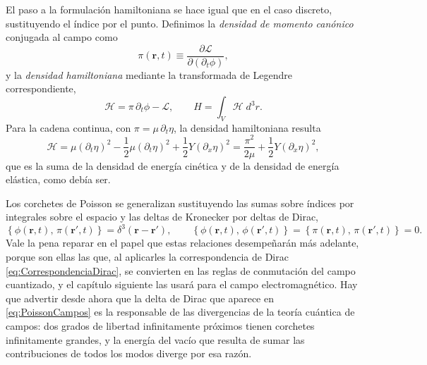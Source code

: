         El paso a la formulación hamiltoniana se hace igual que en el caso discreto, sustituyendo el índice por el punto. Definimos la \textit{densidad de momento canónico} conjugada al campo como
        \begin{equation}\label{eq:MomentoCampo}
            \pi(\mathbf{r},t) \equiv \frac{\partial\mathcal{L}}{\partial\left(\partial_{t}\phi\right)},
        \end{equation}
        y la \textit{densidad hamiltoniana} mediante la transformada de Legendre correspondiente,
        \begin{equation}\label{eq:DensidadHamiltoniana}
            \mathcal{H} = \pi\,\partial_{t}\phi - \mathcal{L},
            \qquad
            H = \int_{V}\mathcal{H}\;d^{3}r .
        \end{equation}
        Para la cadena continua, con $\pi = \mu\,\partial_{t}\eta$, la densidad hamiltoniana resulta
        \begin{equation}\label{eq:HamiltonianoCadena}
            \mathcal{H} = \mu\left(\partial_{t}\eta\right)^{2} - \frac{1}{2}\mu\left(\partial_{t}\eta\right)^{2} + \frac{1}{2}Y\left(\partial_{x}\eta\right)^{2}
            = \frac{\pi^{2}}{2\mu} + \frac{1}{2}Y\left(\partial_{x}\eta\right)^{2},
        \end{equation}
        que es la suma de la densidad de energía cinética y de la densidad de energía elástica, como debía ser.

        Los corchetes de Poisson se generalizan sustituyendo las sumas sobre índices por integrales sobre el espacio y las deltas de Kronecker por deltas de Dirac,
        \begin{equation}\label{eq:PoissonCampos}
            \left\{\phi(\mathbf{r},t),\,\pi(\mathbf{r}',t)\right\} = \delta^{3}\left(\mathbf{r}-\mathbf{r}'\right),
            \qquad
            \left\{\phi(\mathbf{r},t),\,\phi(\mathbf{r}',t)\right\} = \left\{\pi(\mathbf{r},t),\,\pi(\mathbf{r}',t)\right\} = 0 .
        \end{equation}
        Vale la pena reparar en el papel que estas relaciones desempeñarán más adelante, porque son ellas las que, al aplicarles la correspondencia de Dirac \eqref{eq:CorrespondenciaDirac}, se convierten en las reglas de conmutación del campo cuantizado, y el capítulo siguiente las usará para el campo electromagnético. Hay que advertir desde ahora que la delta de Dirac que aparece en \eqref{eq:PoissonCampos} es la responsable de las divergencias de la teoría cuántica de campos: dos grados de libertad infinitamente próximos tienen corchetes infinitamente grandes, y la energía del vacío que resulta de sumar las contribuciones de todos los modos diverge por esa razón.

